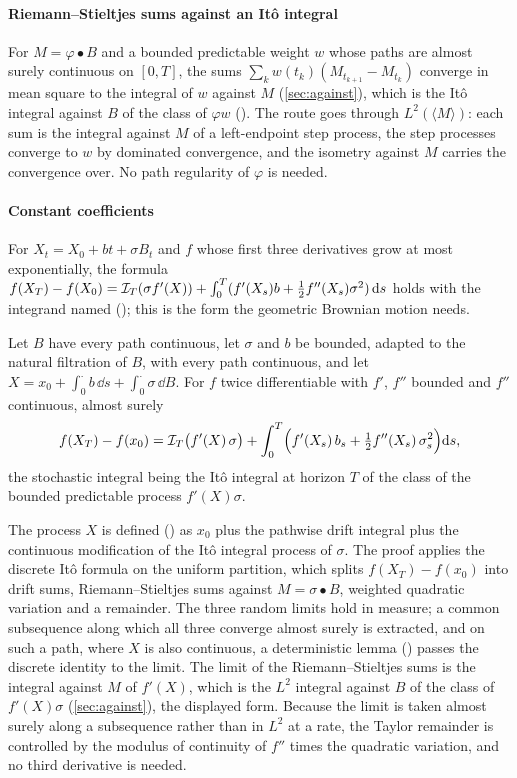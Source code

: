 \documentclass[11pt]{article}
\newcommand{\bulletB}{\mathbin{\bullet}}
\begin{document}
\paragraph{Riemann--Stieltjes sums against an It\^o integral}
For $M=\varphi\bulletB B$ and a bounded predictable weight $w$ whose paths are almost surely continuous on $[0,T]$,
the sums $\sum_kw(t_k)(M_{t_{k+1}}-M_{t_k})$ converge in mean square to the integral of $w$ against $M$
(\cref{sec:against}), which is the It\^o integral against $B$ of the class of $\varphi w$
(). The route goes through $L^2(\langle M\rangle)$: each sum is the integral
against $M$ of a left-endpoint step process, the step processes converge to $w$ by dominated convergence, and
the isometry against $M$ carries the convergence over. No path regularity of $\varphi$ is needed.

\paragraph{Constant coefficients}
For $X_t=X_0+bt+\sigma B_t$ and $f$ whose first three derivatives grow at most exponentially, the formula
$f(X_T)-f(X_0)=\mathcal{I}_T(\sigma f'(X))+\int_0^T(f'(X_s)b+\frac12f''(X_s)\sigma^2)\,\mathrm{d} s$ holds with the integrand
named (); this is the form the geometric Brownian motion needs.

\begin{theorem}\label{thm:adapted}
Let $B$ have every path continuous, let $\sigma$ and $b$ be bounded, adapted to the natural filtration of $B$,
with every path continuous, and let $X=x_0+\int_0^\cdot b\,\dd s+\int_0^\cdot\sigma\,\dd B$. For $f$ twice
differentiable with $f'$, $f''$ bounded and $f''$ continuous, almost surely
\[
  f(X_T)-f(x_0)=\mathcal{I}_T\bigl(f'(X)\,\sigma\bigr)+\int_0^T\Bigl(f'(X_s)\,b_s+\tfrac12f''(X_s)\,\sigma_s^2\Bigr)\mathrm{d} s ,
\]
the stochastic integral being the It\^o integral at horizon $T$ of the class of the bounded predictable process
$f'(X)\sigma$.
\end{theorem}

The process $X$ is defined () as $x_0$ plus the pathwise drift integral plus the
continuous modification of the It\^o integral process of $\sigma$. The proof applies the discrete It\^o formula
on the uniform partition, which splits $f(X_T)-f(x_0)$ into drift sums, Riemann--Stieltjes sums against
$M=\sigma\bulletB B$, weighted quadratic variation and a remainder. The three random limits hold in measure; a
common subsequence along which all three converge almost surely is extracted, and on such a path, where $X$ is
also continuous, a deterministic lemma () passes the discrete identity to the
limit. The limit of the Riemann--Stieltjes sums is the integral against $M$ of $f'(X)$, which is the $L^2$ integral against
$B$ of the class of $f'(X)\sigma$ (\cref{sec:against}), the displayed form. Because the limit is taken almost surely along a
subsequence rather than in $L^2$ at a rate, the Taylor remainder is controlled by the modulus of continuity of $f''$
times the quadratic variation, and no third derivative is needed.
\end{document}
